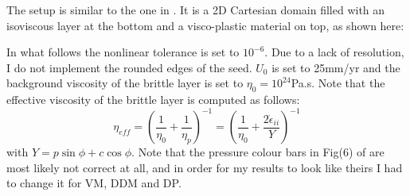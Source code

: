 The setup is similar to the one in \cite{spmw16}. It is a 2D Cartesian domain filled with an 
isoviscous layer at the bottom and a visco-plastic material on top, as shown here:  



In what follows the nonlinear tolerance is set to $10^{-6}$. Due to a lack of resolution, I do not
implement the rounded edges of the seed. $U_0$ is set to 25mm/yr and the background viscosity of the brittle layer
is set to $\eta_0=10^{24}$Pa.s. Note that the effective viscosity of the brittle layer is computed as follows:
\[
\eta_{eff}
=\left( \frac{1}{\eta_0} + \frac{1}{\eta_p}  \right)^{-1}
=\left( \frac{1}{\eta_0} + \frac{2 \dot{\epsilon}_{ii}}{Y}  \right)^{-1}
\]
with $Y=p \sin \phi + c \cos \phi$. 
Note that the pressure colour bars in Fig(6) of \cite{spmw16} are most likely not correct at all, 
and in order for my results to look like theirs I had to change it for VM, DDM and DP. 






